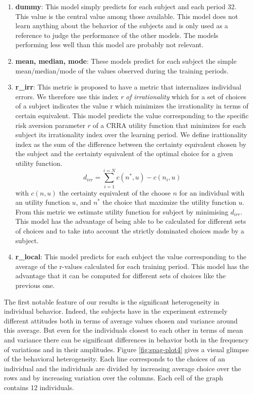 \documentclass[
]{book}
\providecommand{\tightlist}{%
  \setlength{\itemsep}{0pt}\setlength{\parskip}{0pt}}
\begin{document}
\begin{enumerate}
\def\labelenumi{\arabic{enumi}.}
\tightlist
\item
  \textbf{dummy}: This model simply predicts for each subject and each
  period 32.
  This value is the central value among those available.
  This model does not learn anything about the behavior of the
  subjects and is only used as a reference to judge the performance of
  the other models.
  The models performing less well than this model are probably not relevant.
\item
  \textbf{mean, median, mode}: These models predict for each subject the simple
  mean/median/mode of the values observed during the training periods.
\item
  \textbf{r\_irr}: This metric is proposed to have a metric that internalizes
  individual errors.
  We therefore use this index \emph{r of irrationality} which for a set of choices of a
  subject indicates the value r which minimizes the irrationality in terms of
  certain equivalent.
  This model predicts the value corresponding to the specific risk
  aversion parameter \(r\) of a CRRA utility function
  that minimizes for each subject its irrationality index over
  the learning period.
  We define irattionality index as the sum of the
  difference between the certainty equivalent chosen by the subject
  and the certainty equivalent of the optimal choice for a given
  utility function.
  \[
  d_{irr} = \sum_{i =1}^{i = N}c(n^*, u)-c(n_i, u) 
  \]
  with \(c(n, u)\) the certainty equivalent of the choose \(n\) for
  an individual with an utility function \(u\), and \(n^*\) the choice that
  maximize the utility function \(u\).
  From this metric we estimate utility function for subject by minimising
  \(d_{irr}\).
  This model has the advantage of being able to be calculated for different sets
  of choices and to take into account the strictly dominated choices made by a subject.
\item
  \textbf{r\_local}: This model predicts for each subject the value
  corresponding to the average of the r-values calculated for each
  training period. This model has the advantage that it can be
  computed for different sets of choices like the previous one.
\end{enumerate}

The first notable feature of our results is the significant heterogeneity in
individual behavior. Indeed, the subjects have in the experiment
extremely different attitudes both in terms of average values chosen and
variance around this average. But even for the individuals closest to each other
in terms of mean and variance there can be significant differences in behavior
both in the frequency of variations and in their amplitudes.
Figure \ref{fig:spag-plot4} gives a visual glimpse of the behavioral
heterogeneity.
Each line corresponds to the choices of an individual and the individuals are
divided by increasing average choice over the rows and by increasing variation
over the columns.
Each cell of the graph contains 12 individuals.
\end{document}
